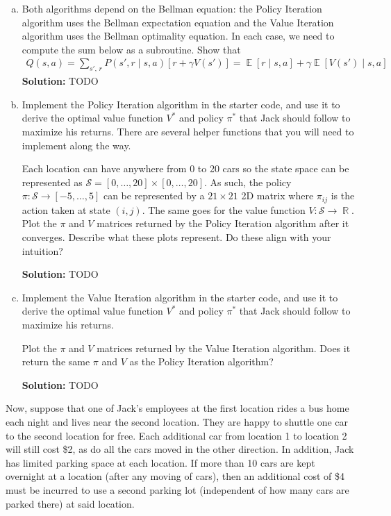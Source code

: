 \documentclass{article}
\DeclareMathOperator{\R}{\mathbb{R}}
\DeclareMathOperator*{\E}{\mathbb{E}}
\newenvironment{solution}{\color{blue} \smallskip \textbf{Solution:}}{}
\begin{document}
\begin{enumerate}[(a)]
\item
Both algorithms depend on the Bellman equation: the Policy Iteration algorithm uses the Bellman expectation equation and the Value Iteration algorithm uses the Bellman optimality equation. In each case, we need to compute the sum below as a subroutine. Show that 
\begin{align*}
    Q(s, a) = \sum_{s',\, r} P(s', r \mid s, a)[r + \gamma V(s')] = \E[r \mid s, a] + \gamma\E[V(s') \mid s, a]
\end{align*}
\begin{solution}
TODO
\end{solution}

\clearpage
\item 
Implement the Policy Iteration algorithm in the starter code, and use it to derive the optimal value function $V^{*}$ and policy $\pi^*$ that Jack should follow to maximize his returns. There are several helper functions that you will need to implement along the way.

Each location can have anywhere from 0 to 20 cars so the state space can be represented as $\mathcal{S} = [0, \dots, 20] \times [0, \dots, 20]$. As such, the policy $\pi : \mathcal{S} \to [-5, \dots, 5]$ can be represented by a $21 \times 21$ 2D matrix where $\pi_{ij}$ is the action taken at state $(i, j)$. The same goes for the value function $V : \mathcal{S} \to \R$. Plot the $\pi$ and $V$ matrices returned by the Policy Iteration algorithm after it converges. Describe what these plots represent. Do these align with your intuition?

\begin{solution}
TODO
\end{solution}

\clearpage
\item 
Implement the Value Iteration algorithm in the starter code, and use it to derive the optimal value function $V^{*}$ and policy $\pi^*$ that Jack should follow to maximize his returns.

Plot the $\pi$ and $V$ matrices returned by the Value Iteration algorithm. Does it return the same $\pi$ and $V$ as the Policy Iteration algorithm?

\begin{solution}
TODO
\end{solution}
\end{enumerate}

\clearpage
Now, suppose that one of Jack's employees at the first location rides a bus home each night and lives near the second location. They are happy to shuttle one car to the second location for free. Each additional car from location 1 to location 2 will still cost \$2, as do all the cars moved in the other direction. In addition, Jack has limited parking space at each location. If more than 10 cars are kept overnight at a location (after any moving of cars), then an additional cost of \$4 must be incurred to use a second parking lot (independent of how many cars are parked there) at said location. 
\end{document}
